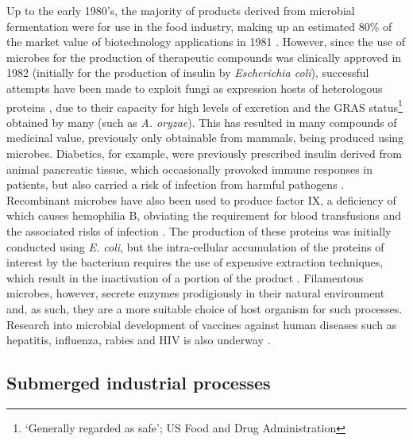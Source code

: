 Up to the early 1980's, the majority of products derived from microbial fermentation were for use in the food industry, making up an estimated 80\% of the market value of biotechnology applications in 1981 \cite{glazer2007}. However, since the use of microbes for the production of therapeutic compounds was clinically approved in 1982 (initially for the production of insulin by \emph{Escherichia coli}), successful attempts have been made to exploit fungi as expression hosts of heterologous proteins \cite{iwashita2002}, due to their capacity for high levels of excretion and the GRAS status\footnote{\lq Generally regarded as safe'; US Food and Drug Administration} obtained by many (such as \emph{A. oryzae}). This has resulted in many compounds of medicinal value, previously only obtainable from mammals, being produced using microbes. Diabetics, for example, were previously prescribed insulin derived from animal pancreatic tissue, which occasionally provoked immune responses in patients, but also carried a risk of infection from harmful pathogens \cite{kreuzer2005}. Recombinant microbes have also been used to produce factor IX, a deficiency of which causes hemophilia B, obviating the requirement for blood transfusions and the associated risks of infection \cite{kreuzer2005}. The production of these proteins was initially conducted using \emph{E. coli}, but the intra-cellular accumulation of the proteins of interest by the bacterium requires the use of expensive extraction techniques, which result in the inactivation of a portion of the product \cite{archer2001}. Filamentous microbes, however, secrete enzymes prodigiously in their natural environment and, as such, they are a more suitable choice of host organism for such processes. Research into microbial development of vaccines against human diseases such as hepatitis, influenza, rabies and HIV is also underway \cite{glazer2007}.

\subsection{Submerged industrial processes}

